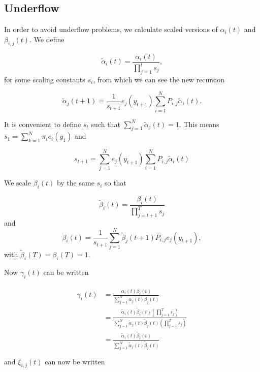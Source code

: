 \documentclass{article}
\begin{document}

\subsection{Underflow}
In order to avoid underflow problems, we calculate scaled versions of
$\alpha_i(t)$ and $\beta_{i,j}(t)$. We define 

\begin{equation}
    \tilde{\alpha}_i(t) = \frac{\alpha_i(t)}{\prod_{j=1}^t s_j},
\end{equation}
for some scaling constants $s_i$, from which we can see the new recursion

\begin{equation}
    \tilde{\alpha}_j(t+1) = \frac{1}{s_{t+1}}e_j(y_{t+1})
        \sum_{i=1}^NP_{i,j}\tilde{\alpha}_i(t).
\end{equation}

It is convenient to define $s_t$ such that 
$\sum_{j=1}^N \tilde{\alpha}_j(t) = 1$. This means 
$s_1 = \sum_{k=1}^N \pi_i e_i(y_1)$ and 

\begin{equation}
    s_{t+1} = \sum_{j=1}^Ne_j(y_{t+1})\sum_{i=1}^NP_{i,j}\tilde{\alpha}_i(t)
\end{equation}

We scale $\beta_i(t)$ by the same $s_i$ so that

\begin{equation}
    \tilde{\beta}_i(t) = \frac{\beta_i(t)}{\prod_{j=t+1}^T s_j}
\end{equation}
and
\begin{equation}
    \tilde{\beta}_i(t) = \frac{1}{s_{t+1}}\sum_{j=1}^N\tilde{\beta}_j(t+1)P_{i,j}e_j(y_{t+1}),
\end{equation}
with $\tilde{\beta}_i(T) = \beta_i(T) = 1$.

Now $\gamma_i(t)$ can be written

\begin{align}
    \begin{split}
        \gamma_i(t) &=
        \frac{\alpha_i(t)\beta_i(t)}{\sum_{j=1}^N\alpha_j(t)\beta_j(t)} \\
        &=
        \frac{\tilde{\alpha}_i(t)\tilde{\beta}_i(t)\left(\prod_{j=1}^Ts_j\right)}
        {\sum_{j=1}^N\tilde{\alpha}_j(t)\tilde{\beta}_j(t)\left(\prod_{j=1}^Ts_j\right)} \\
        &=
        \frac{\tilde{\alpha}_i(t)\tilde{\beta}_i(t)}
        {\sum_{j=1}^N\tilde{\alpha}_j(t)\tilde{\beta}_j(t)} \\
    \end{split}
\end{align}
and $\xi_{i,j}(t)$ can now be written
\end{document}
